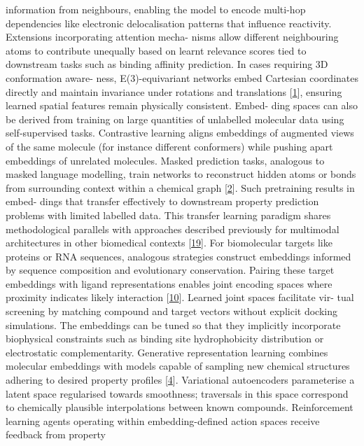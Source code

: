 \documentclass[
]{article}
\begin{document}
information from neighbours, enabling the model to encode multi-hop
dependencies like electronic delocalisation patterns that influence
reactivity. Extensions incorporating attention mecha- nisms allow
different neighbouring atoms to contribute unequally based on learnt
relevance scores tied to downstream tasks such as binding affinity
prediction. In cases requiring 3D conformation aware- ness,
E(3)-equivariant networks embed Cartesian coordinates directly and
maintain invariance under rotations and translations
{[}\protect\hyperlink{_bookmark41}{1}{]}, ensuring learned spatial
features remain physically consistent. Embed- ding spaces can also be
derived from training on large quantities of unlabelled molecular data
using self-supervised tasks. Contrastive learning aligns embeddings of
augmented views of the same molecule (for instance different conformers)
while pushing apart embeddings of unrelated molecules. Masked prediction
tasks, analogous to masked language modelling, train networks to
reconstruct hidden atoms or bonds from surrounding context within a
chemical graph {[}\protect\hyperlink{_bookmark42}{2}{]}. Such
pretraining results in embed- dings that transfer effectively to
downstream property prediction problems with limited labelled data. This
transfer learning paradigm shares methodological parallels with
approaches described previously for multimodal architectures in other
biomedical contexts {[}\protect\hyperlink{_bookmark59}{19}{]}. For
biomolecular targets like proteins or RNA sequences, analogous
strategies construct embeddings informed by sequence composition and
evolutionary conservation. Pairing these target embeddings with ligand
representations enables joint encoding spaces where proximity indicates
likely interaction {[}\protect\hyperlink{_bookmark50}{10}{]}. Learned
joint spaces facilitate vir- tual screening by matching compound and
target vectors without explicit docking simulations. The embeddings can
be tuned so that they implicitly incorporate biophysical constraints
such as binding site hydrophobicity distribution or electrostatic
complementarity. Generative representation learning combines molecular
embeddings with models capable of sampling new chemical structures
adhering to desired property profiles
{[}\protect\hyperlink{_bookmark44}{4}{]}. Variational autoencoders
parameterise a latent space regularised towards smoothness; traversals
in this space correspond to chemically plausible interpolations between
known compounds. Reinforcement learning agents operating within
embedding-defined action spaces receive feedback from property
\end{document}

